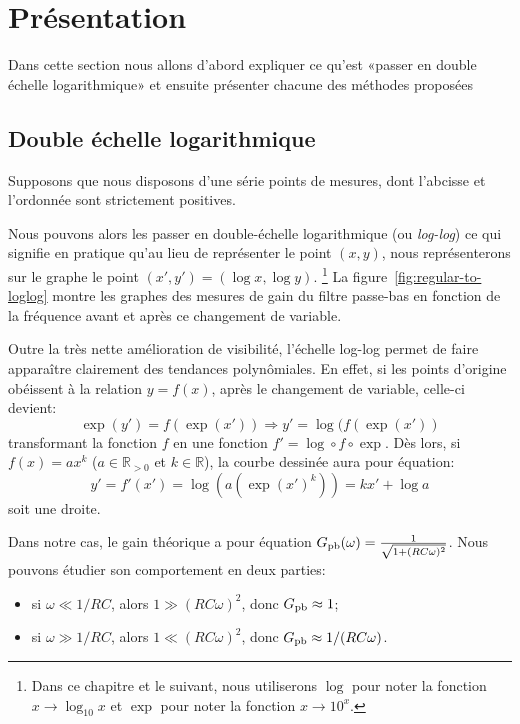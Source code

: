 \section{Présentation}
\label{sec:approx-lin/pres}

Dans cette section nous allons d'abord expliquer ce qu'est
«passer en double échelle logarithmique» et ensuite présenter
chacune des méthodes proposées

\subsection{Double échelle logarithmique}
Supposons que nous disposons d'une série points de mesures,
dont l'abcisse et l'ordonnée sont strictement positives.

Nous pouvons alors les passer
en double-échelle logarithmique (ou \emph{log-log})
ce qui signifie en pratique qu'au lieu de représenter le point $(x,y)$,
nous représenterons sur le graphe le point $(x',y') = (\log x,\log y)$.%
\footnote{
    Dans ce chapitre et le suivant, nous utiliserons
    $\log$ pour noter la fonction $x \to \log_{10} x$
    et $\exp$ pour noter la fonction $x \to 10^x$.
}
La figure~\ref{fig:regular-to-loglog} montre les graphes
des mesures de gain du filtre passe-bas en fonction de la fréquence
avant et après ce changement de variable.

Outre la très nette amélioration de visibilité,
l'échelle log-log permet de faire apparaître clairement
des tendances polynômiales.
En effet, si les points d'origine obéissent à la relation $y = f(x)$,
après le changement de variable, celle-ci devient:
\begin{equation}
    \exp(y') = f(\exp(x')) \Longrightarrow y' = \log(f(\exp(x'))
\end{equation}
transformant la fonction $f$ en une fonction $f' = \log\circ f\circ\exp$.
Dès lors, si $f(x) = ax^k$ ($a \in \mathbb{R}_{>0}$ et $k \in \mathbb{R}$),
la courbe dessinée aura pour équation:
\begin{equation}
    y' = f'(x') = \log(a(\exp(x')^k)) = kx'+\log a
\end{equation}
soit une droite.

Dans notre cas, le gain théorique a pour équation
$G_{\mathrm{pb}}(\omega) = \frac{1}{\sqrt{1+(RC\omega)^2}}$.
Nous pouvons étudier son comportement en deux parties:
\begin{itemize}
    \item si $\omega \ll 1/RC$, alors $1 \gg (RC\omega)^2$,
        donc $G_{\mathrm{pb}} \approx 1$;
    \item si $\omega \gg 1/RC$, alors $1 \ll (RC\omega)^2$,
        donc $G_{\mathrm{pb}} \approx 1/(RC\omega)$.
\end{itemize}

